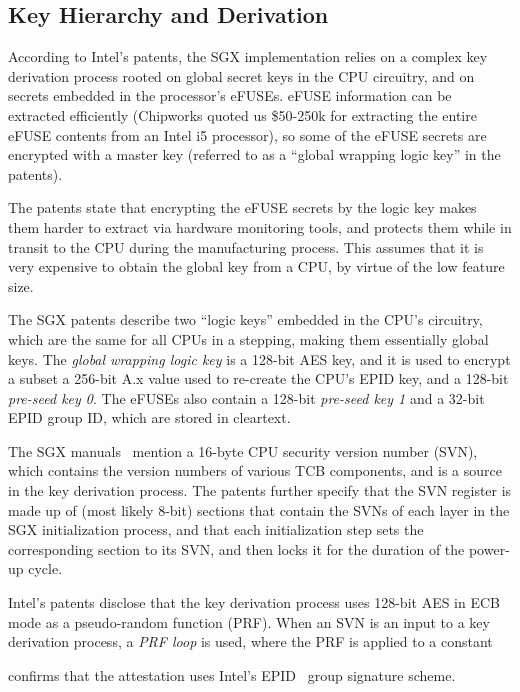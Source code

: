\subsection{Key Hierarchy and Derivation}

According to Intel's patents, the SGX implementation relies on a complex key
derivation process rooted on global secret keys in the CPU circuitry, and on
secrets embedded in the processor's eFUSEs. eFUSE information can be extracted
efficiently (Chipworks quoted us \$50-250k for extracting the entire eFUSE
contents from an Intel i5 processor), so some of the eFUSE secrets are
encrypted with a master key (referred to as a ``global wrapping logic key'' in
the patents).

The patents state that encrypting the eFUSE secrets by the logic key makes them
harder to extract via hardware monitoring tools, and protects them while in
transit to the CPU during the manufacturing process. This assumes that it is
very expensive to obtain the global key from a CPU, by virtue of the low
feature size.

The SGX patents describe two ``logic keys'' embedded in the CPU's circuitry,
which are the same for all CPUs in a stepping, making them essentially global
keys. The \textit{global wrapping logic key} is a 128-bit AES key, and it is
used to encrypt a subset a 256-bit A.x value used to re-create the CPU's EPID
key, and a 128-bit \textit{pre-seed key 0}. The eFUSEs also contain a 128-bit
\textit{pre-seed key 1} and a 32-bit EPID group ID, which are stored in
cleartext.

The SGX manuals~\cite{intel2013sgxmanual, intel2014sgx2manual} mention a
16-byte CPU security version number (SVN), which contains the version numbers
of various TCB components, and is a source in the key derivation process. The
patents further specify that the SVN register is made up of (most likely 8-bit)
sections that contain the SVNs of each layer in the SGX initialization process,
and that each initialization step sets the corresponding section to its SVN,
and then locks it for the duration of the power-up cycle.

Intel's patents disclose that the key derivation process uses 128-bit AES in
ECB mode as a pseudo-random function (PRF). When an SVN is an input to a key
derivation process, a \textit{PRF loop} is used, where the PRF is applied to
a constant



\cite{anati2013sgx} confirms that the attestation uses Intel's
EPID~\cite{brickell2009epid} group signature scheme.


